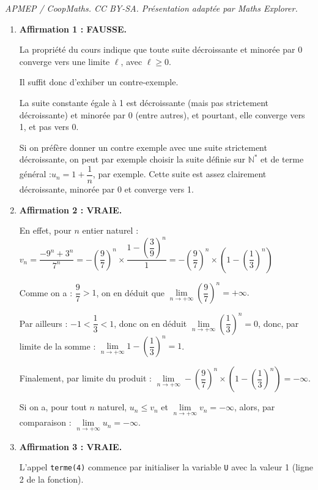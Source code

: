 \documentclass[10pt]{article}
\providecommand{\N}{\mathbb{N}}
\begin{document}
\noindent\textit{APMEP / CoopMaths. CC BY-SA. Présentation adaptée par Maths Explorer.}\par\medskip
\medskip

\begin{enumerate}
	\item \textbf{Affirmation 1 : FAUSSE.}

	La propriété du cours indique que toute suite décroissante et minorée par 0 converge vers une limite $\ell$, avec $\ell\geqslant 0$.

	Il suffit donc d'exhiber un contre-exemple.

	La suite constante égale à 1 est décroissante (mais pas strictement décroissante) et minorée par 0 (entre autres), et pourtant, elle converge vers 1, et pas vers 0.

	Si on préfère donner un contre exemple avec une suite strictement décroissante, on peut par exemple choisir la suite définie sur $\N^*$ et de terme général :\quad $u_n = 1 + \dfrac{1}{n}$, par exemple. Cette suite est assez clairement décroissante, minorée par 0 et converge vers 1.

	\item \textbf{Affirmation 2 : VRAIE.}

	En effet, pour $n$ entier naturel :\quad $v_n = \dfrac{-9^n + 3^n}{7^n} = -\left(\dfrac{9}{7}\right)^n \times \dfrac{1 - \left(\dfrac{3}{9}\right)^n }{1} = -\left(\dfrac{9}{7}\right)^n \times \left(1 - \left(\dfrac{1}{3}\right)^n\right)$

	Comme on a : $\dfrac{9}{7}>1$, on en déduit que $\lim\limits_{n \to +\infty} \left(\dfrac{9}{7}\right)^n = +\infty.$

	Par ailleurs : $-1 < \dfrac{1}{3}<1$, donc on en déduit $\lim\limits_{n \to +\infty} \left(\dfrac{1}{3}\right)^n = 0$, donc, par limite de la somme : $\lim\limits_{n \to +\infty} 1 - \left(\dfrac{1}{3}\right)^n = 1$.

	Finalement, par limite du produit : $\lim\limits_{n \to +\infty} -\left(\dfrac{9}{7}\right)^n \times \left(1 - \left(\dfrac{1}{3}\right)^n\right) = -\infty$.

	Si on a, pour tout $n$ naturel, $u_n \leqslant v_n$ et $\lim\limits_{n \to +\infty} v_n = -\infty$, alors, par comparaison : \quad $\lim\limits_{n \to + \infty} u_n = -\infty$.

	\item \textbf{Affirmation 3 : VRAIE.}

	L'appel \texttt{terme(4)} commence par initialiser la variable \texttt{U} avec la valeur 1 (ligne 2 de la fonction).


\end{enumerate}
\end{document}
